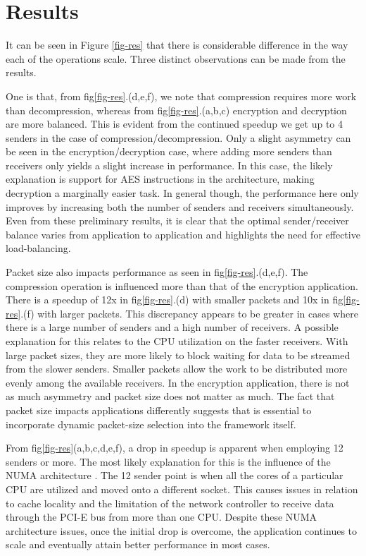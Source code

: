 \documentclass[conference]{IEEEtran}
\newcommand{\comment}[1]{}
\begin{document}
\section{Results}
\label{results}
It can be seen in Figure \ref{fig-res} that there is considerable difference in the way each of the operations scale. Three distinct observations can be made from the results.

One is that, from fig\ref{fig-res}.(d,e,f), we note that compression requires more work than decompression, whereas from fig\ref{fig-res}.(a,b,c) encryption and decryption are more balanced. This is evident from the continued speedup we get up to 4 senders in the case of compression/decompression. Only a slight asymmetry can be seen in the encryption/decryption case, where adding more senders than receivers only yields a slight increase in performance. In this case, the likely explanation is support for AES instructions in the architecture, making decryption a marginally easier task. In general though, the performance here only improves by increasing both the number of senders and receivers simultaneously. Even from these preliminary results, it is clear that the optimal sender/receiver balance varies from application to application and highlights the need for effective load-balancing.

Packet size also impacts performance as seen in fig\ref{fig-res}.(d,e,f). The compression operation is influenced more than that of the encryption application. There is a speedup of 12x in fig\ref{fig-res}.(d) with smaller packets and 10x in fig\ref{fig-res}.(f) with larger packets. This discrepancy appears to be greater in cases where there is a large number of senders and a high number of receivers. A possible explanation for this relates to the CPU utilization on the faster receivers. With large packet sizes, they are more likely to block waiting for data to be streamed from the slower senders. Smaller packets allow the work to be distributed more evenly among the available receivers. In the encryption application, there is not as much asymmetry and packet size does not matter as much. The fact that packet size impacts applications differently suggests that is essential to incorporate dynamic packet-size selection into the framework itself.\comment{ to respond to the unique requirements of each application.}

From fig\ref{fig-res}(a,b,c,d,e,f), a drop in speedup is apparent when employing 12 senders or more. The most likely explanation for this is the influence of the NUMA architecture \cite{Awasthi:2010:HPO:1854273.1854314}. The 12 sender point is when all the cores of a particular CPU are utilized and moved onto a different socket. This causes issues in relation to cache locality and the limitation of the network controller to receive data through the PCI-E bus from more than one CPU. Despite these NUMA architecture issues, once the initial drop is overcome, the application continues to scale and eventually attain better performance in most cases.
\end{document}
